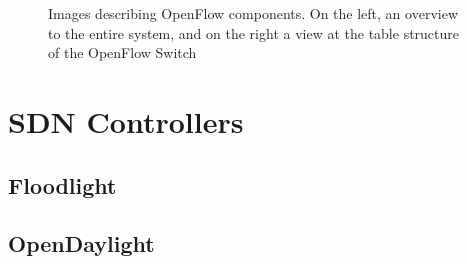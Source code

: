 \begin{figure} [h]
    \begin{subfigure}
    \texttt{[image: sdn/open\_flow\_switch\_pipeline]}
    \end{subfigure}
    \begin{subfigure}
    \texttt{[image: sdn/open\_flow\_tables]}
    \end{subfigure}
\caption{Images describing OpenFlow components. On the left, an overview to the entire system, and on the right a view at the table structure of the OpenFlow Switch}
\end{figure}

\section {SDN Controllers}
\subsection {Floodlight}
\subsection {OpenDaylight} \label{chap:odl}
